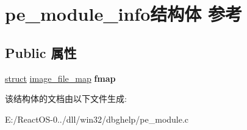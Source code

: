 \hypertarget{structpe__module__info}{}\section{pe\+\_\+module\+\_\+info结构体 参考}
\label{structpe__module__info}
\subsection*{Public 属性}
\begin{DoxyCompactItemize}
\item 
\mbox{\label{structpe__module__info_afa25117d62f409d25bdc31bdba108a68}} 
\hyperlink{interfacestruct}{struct} \hyperlink{structimage__file__map}{image\+\_\+file\+\_\+map} {\bfseries fmap}
\end{DoxyCompactItemize}


该结构体的文档由以下文件生成\+:\begin{DoxyCompactItemize}
\item 
E\+:/\+React\+O\+S-\/0../dll/win32/dbghelp/pe\+\_\+module.\+c\end{DoxyCompactItemize}
